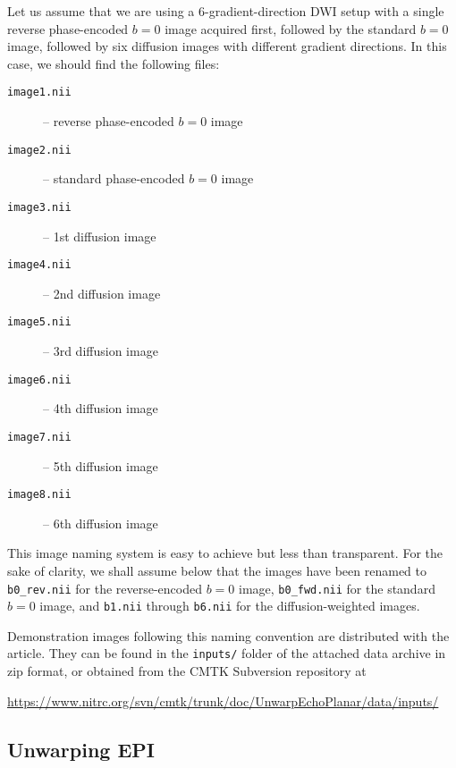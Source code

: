 \documentclass{InsightArticle}
\begin{document}
Let us assume that we are using a 6-gradient-direction DWI setup with a single
reverse phase-encoded $b=0$ image acquired first, followed by the standard
$b=0$ image, followed by six diffusion images with different gradient
directions. In this case, we should find the following files:
\begin{description}
\item[\tt image1.nii] -- reverse phase-encoded $b=0$ image
\item[\tt image2.nii] -- standard phase-encoded $b=0$ image
\item[\tt image3.nii] -- 1st diffusion image
\item[\tt image4.nii] -- 2nd diffusion image
\item[\tt image5.nii] -- 3rd diffusion image
\item[\tt image6.nii] -- 4th diffusion image
\item[\tt image7.nii] -- 5th diffusion image
\item[\tt image8.nii] -- 6th diffusion image
\end{description}

This image naming system is easy to achieve but less than transparent. For the
sake of clarity, we shall assume below that the images have been renamed to
\verb|b0_rev.nii| for the reverse-encoded $b=0$ image, \verb|b0_fwd.nii| for
the standard $b=0$ image, and \verb|b1.nii| through \verb|b6.nii| for the
diffusion-weighted images.

Demonstration images following this naming convention are distributed with the
article. They can be found in the \verb|inputs/| folder of the attached data
archive in zip format, or obtained from the CMTK Subversion repository at

\centerline{\url{https://www.nitrc.org/svn/cmtk/trunk/doc/UnwarpEchoPlanar/data/inputs/}}

\subsection{Unwarping EPI}
\end{document}

